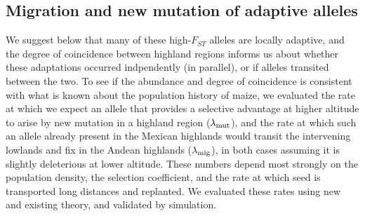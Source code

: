 \subsection*{Migration and new mutation of adaptive alleles}

We suggest below that many of these high-$F_{ST}$ alleles are locally adaptive,
and the degree of coincidence between highland regions informs us about 
whether these adaptations occurred indpendently (in parallel), or if alleles transited between the two.
To see if the abundance and degree of coincidence is consistent with what is known about the population history of maize,
we evaluated the rate at which we expect an allele that provides a selective advantage at higher altitude
to arise by new mutation in a highland region ($\lambda_{\text{mut}}$),
and the rate at which such an allele already present in the Mexican highlands
would transit the intervening lowlands and fix in the Andean highlands ($\lambda_{\text{mig}}$),
in both cases assuming it is slightly deleterious at lower altitude.
These numbers depend most strongly on the population density, 
the selection coefficient,
and the rate at which seed is transported long distances and replanted.
We evaluated these rates using new and existing theory, and validated by simulation.


